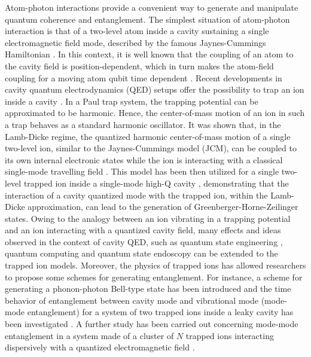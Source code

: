\documentclass[twocolumn,3p,times]{elsarticle}
\begin{document}
Atom-photon interactions provide a convenient way to generate and manipulate quantum coherence and entanglement. The simplest situation of atom-photon interaction is that of a two-level atom inside a cavity sustaining a single electromagnetic field mode, described by the famous Jaynes-Cummings Hamiltonian \cite{IEEE}. In this context, it is well known that the coupling of an atom to the cavity field is position-dependent, which in turn makes the atom-field coupling for a moving atom qubit time dependent \cite{LPL14055201,OpenSyst241740006}. Recent developments in cavity quantum electrodynamics (QED) setups offer the possibility to trap an ion inside a cavity \cite{RevModPhys.82.1209,BlattReview}. In a Paul trap system, the trapping potential can be approximated to be harmonic. Hence, the center-of-mass motion of an ion in such a trap behaves as a standard harmonic oscillator. It was shown that, in the Lamb-Dicke regime, the quantized harmonic center-of-mass motion of a single two-level ion, similar to the Jaynes-Cummings model (JCM), can be coupled to its own internal electronic states while the ion is interacting with a classical single-mode travelling field \cite{EurLet17509}. This model has been then utilized for a single two-level trapped ion inside a single-mode high-Q cavity \cite{PRA562352}, demonstrating that the interaction of a cavity quantized mode with the trapped ion, within the Lamb-Dicke approximation, can lead to the generation of Greenberger-Horne-Zeilinger states. 
Owing to the analogy between an ion vibrating in a trapping potential and an ion interacting with a quantized cavity field, many effects and ideas observed in the context of cavity QED, such as quantum state engineering \cite{PRL761055,PRA592920,EPJD54715,lofrancoPLA,lofranco2006PRA,lofranco2007PRA,lofranco2006OpenSys}, quantum computing \cite{PRL744091,PhyRep469155} and quantum state endoscopy \cite{PRA514963,PRA532736} can be extended to the trapped ion models. Moreover, the physics of trapped ions has allowed researchers to propose some schemes for generating entanglement. For instance, a scheme for generating a phonon-photon Bell-type state has been introduced \cite{PRA64024305} and the time behavior of entanglement between cavity mode and vibrational mode (mode-mode entanglement) for a system of two trapped ions inside a leaky cavity has been investigated \cite{PRA71063817}. A further study has been carried out concerning mode-mode entanglement in a system made of a cluster of $N$ trapped ions interacting dispersively with a quantized electromagnetic field \cite{PRA75042315}.
\end{document}
